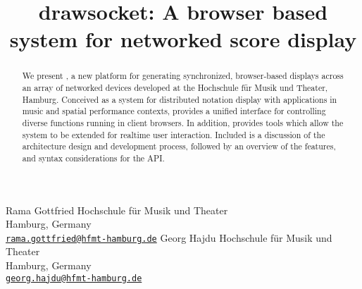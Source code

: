 

\def\papertitle{drawsocket: A browser based system for networked score display%
}
\def\firstauthor{Rama Gottfried}
\def\secondauthor{Georg Hajdu}

\def\Hochschule{ Hochschule f\"ur Musik und Theater}

\title{\papertitle}
 \twoauthors
   {\firstauthor} {	
      Hochschule f\"ur Musik und Theater\\
         Hamburg, Germany \\ %
   \small{\tt \href{mailto:rama.gottfried@hfmt-hamburg.de}{rama.gottfried@hfmt-hamburg.de}}}
    {\secondauthor} {
   Hochschule f\"ur Musik und Theater\\
   Hamburg, Germany \\ %
   \small{\tt \href{mailto:georg.hajdu@hfmt-hamburg.de}{georg.hajdu@hfmt-hamburg.de}}}
 




%

\capstartfalse
\maketitle
\capstarttrue
%
\begin{abstract}
We present \drawsocket, a new platform for generating synchronized, browser-based displays across an array of networked devices developed at the \Hochschule, Hamburg. Conceived as a system for distributed notation display with applications in music and spatial performance contexts, \drawsocket provides a unified interface for controlling diverse functions running in client browsers. 
In addition, \drawsocket provides tools which allow the system to be extended for realtime user interaction.
Included is a discussion of the architecture design and development process, followed by an overview of the features, and syntax considerations for the \drawsocket API.

\end{abstract}

%

